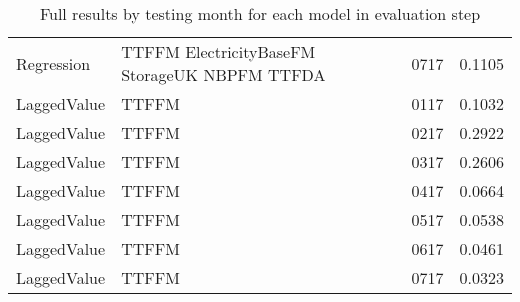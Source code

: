 \begin{table}[h!]
\begin{adjustbox}{max width=\textwidth}
\begin{tabular}{lllr}
  Regression & TTFFM ElectricityBaseFM StorageUK NBPFM TTFDA & 0717 & 0.1105 \\ 
  LaggedValue & TTFFM  & 0117 & 0.1032 \\ 
  LaggedValue & TTFFM  & 0217 & 0.2922 \\ 
  LaggedValue & TTFFM  & 0317 & 0.2606 \\ 
  LaggedValue & TTFFM  & 0417 & 0.0664 \\ 
  LaggedValue & TTFFM  & 0517 & 0.0538 \\ 
  LaggedValue & TTFFM  & 0617 & 0.0461 \\ 
  LaggedValue & TTFFM  & 0717 & 0.0323 \\ 
   \hline
 \end{tabular}
\end{adjustbox}
\caption{Full results by testing month for each model in evaluation step} 
\label{tab:level.eval.short}
\end{table}

